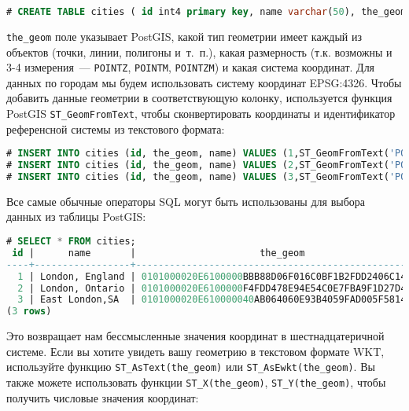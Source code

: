 \begin{lstlisting}[language=SQL,label=lst:postgiscreatecities,caption=Создание таблицы cities]
# CREATE TABLE cities ( id int4 primary key, name varchar(50), the_geom geometry(POINT,4326) );
\end{lstlisting}

\lstinline!the_geom! поле указывает PostGIS, какой тип геометрии имеет каждый из объектов (точки, линии, полигоны и~т.~п.), какая размерность (т.к. возможны и 3-4 измерения~--- \lstinline!POINTZ!, \lstinline!POINTM!, \lstinline!POINTZM!) и какая система координат. Для данных по городам мы будем использовать систему координат EPSG:4326. Чтобы добавить данные геометрии в соответствующую колонку, используется функция PostGIS \lstinline!ST_GeomFromText!, чтобы сконвертировать координаты и идентификатор референсной системы из текстового формата:

\begin{lstlisting}[language=SQL,label=lst:postgisinsertcities,caption=Заполнение таблицы cities]
# INSERT INTO cities (id, the_geom, name) VALUES (1,ST_GeomFromText('POINT(-0.1257 51.508)',4326),'London, England');
# INSERT INTO cities (id, the_geom, name) VALUES (2,ST_GeomFromText('POINT(-81.233 42.983)',4326),'London, Ontario');
# INSERT INTO cities (id, the_geom, name) VALUES (3,ST_GeomFromText('POINT(27.91162491 -33.01529)',4326),'East London,SA');
\end{lstlisting}

Все самые обычные операторы SQL могут быть использованы для выбора данных из таблицы PostGIS:

\begin{lstlisting}[language=SQL,label=lst:postgisselectcities,caption=SELECT cities]
# SELECT * FROM cities;
 id |      name       |                      the_geom
----+-----------------+----------------------------------------------------
  1 | London, England | 0101000020E6100000BBB88D06F016C0BF1B2FDD2406C14940
  2 | London, Ontario | 0101000020E6100000F4FDD478E94E54C0E7FBA9F1D27D4540
  3 | East London,SA  | 0101000020E610000040AB064060E93B4059FAD005F58140C0
(3 rows)
\end{lstlisting}

Это возвращает нам бессмысленные значения координат в шестнадцатеричной системе. Если вы хотите увидеть вашу геометрию в текстовом формате WKT, используйте функцию \lstinline!ST_AsText(the_geom)! или \lstinline!ST_AsEwkt(the_geom)!. Вы также можете использовать функции \lstinline!ST_X(the_geom)!, \lstinline!ST_Y(the_geom)!, чтобы получить числовые значения координат:

